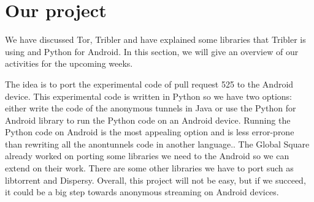\section{Our project}
	\label{sec:our-project}
	We have discussed Tor, Tribler and have explained some libraries that Tribler is using and Python for Android. In this section, we will give an overview of our activities for the upcoming weeks.
		
	The idea is to port the experimental code of pull request 525 to the Android device. This experimental code is written in Python so we have two options: either write the code of the anonymous tunnels in Java or use the Python for Android library to run the Python code on an Android device. Running the Python code on Android is the most appealing option and is less error-prone than rewriting all the anontunnels code in another language.. The Global Square already worked on porting some libraries we need to the Android so we can extend on their work. There are some other libraries we have to port such as libtorrent and Dispersy. Overall, this project will not be easy, but if we succeed, it could be a big step towards anonymous streaming on Android devices.